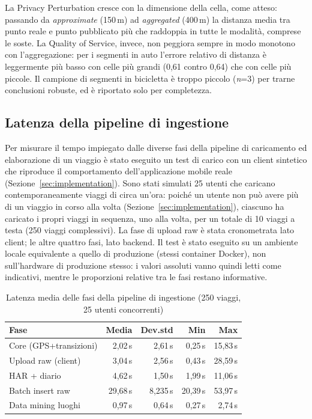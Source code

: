 \documentclass[conference]{IEEEtran}
\begin{document}
La Privacy Perturbation cresce con la dimensione della cella, come
atteso: passando da \emph{approximate} (150\,m) ad \emph{aggregated}
(400\,m) la distanza media tra punto reale e punto pubblicato più che
raddoppia in tutte le modalità, comprese le soste. La Quality of
Service, invece, non peggiora sempre in modo monotono con
l'aggregazione: per i segmenti in auto l'errore relativo di distanza è
leggermente più basso con celle più grandi (0,61 contro 0,64) che con
celle più piccole.
Il campione di segmenti in bicicletta è troppo piccolo (\emph{n}=3) per trarne conclusioni robuste, ed è
riportato solo per completezza.

\subsection{Latenza della pipeline di ingestione}

Per misurare il tempo impiegato dalle diverse fasi della pipeline di
caricamento ed elaborazione di un viaggio è stato eseguito un test di
carico con un client sintetico che riproduce il comportamento
dell'applicazione mobile reale (Sezione~\ref{sec:implementation}).
Sono stati simulati 25 utenti che caricano contemporaneamente viaggi
di circa un'ora: poiché un utente non può avere più di un viaggio in
corso alla volta (Sezione~\ref{sec:implementation}), ciascuno ha
caricato i propri viaggi in sequenza, uno alla volta, per un totale
di 10 viaggi a testa (250 viaggi complessivi). La fase di upload raw è
stata cronometrata lato client; le altre quattro fasi, lato backend.
Il test è stato eseguito su un
ambiente locale equivalente a quello di produzione (stessi container
Docker), non sull'hardware di produzione stesso: i valori assoluti
vanno quindi letti come indicativi, mentre le proporzioni relative
tra le fasi restano informative.

\begin{table}[htbp]
\caption{Latenza media delle fasi della pipeline di ingestione (250 viaggi, 25 utenti concorrenti)}
\centering
\scriptsize
\begin{tabular}{|l|r|r|r|r|}
\hline
\textbf{Fase} & \textbf{Media} & \textbf{Dev.std} & \textbf{Min} & \textbf{Max} \\
\hline
Core (GPS+transizioni) & 2,02\,s & 2,61\,s & 0,25\,s & 15,83\,s \\
\hline
Upload raw (client) & 3,04\,s & 2,56\,s & 0,43\,s & 28,59\,s \\
\hline
HAR + diario & 4,62\,s & 1,50\,s & 1,99\,s & 11,06\,s \\
\hline
Batch insert raw & 29,68\,s & 8,235\,s & 20,39\,s & 53,97\,s \\
\hline
Data mining luoghi & 0,97\,s & 0,64\,s & 0,27\,s & 2,74\,s \\
\hline
\end{tabular}
\label{tab:pipeline-latency}
\end{table}
\end{document}
